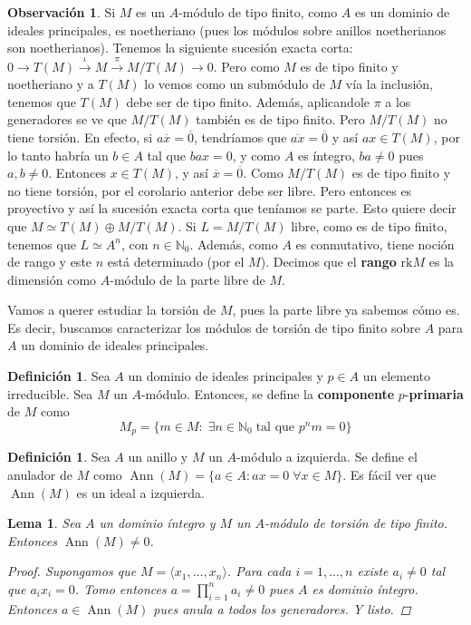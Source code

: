 \documentclass[12pt]{book}
\newtheorem{lem}[teo]{Lema}
\theoremstyle{definition}
\newtheorem{obs}[teo]{Observación}
\newtheorem{defn}[teo]{Definición}
\DeclareMathOperator{\ann}{Ann}
\begin{document}
\begin{obs}
Si $M$ es un $A$-módulo de tipo finito, como $A$ es un dominio de ideales principales, es noetheriano (pues los módulos sobre anillos noetherianos son noetherianos). Tenemos la siguiente sucesión exacta corta: $0\longrightarrow T(M)\stackrel{\iota}{\longrightarrow} M\stackrel{\pi}{\longrightarrow} M/T(M)\longrightarrow 0$. Pero como $M$ es de tipo finito y noetheriano y a $T(M)$ lo vemos como un submódulo de $M$ vía la inclusión, tenemos que $T(M)$ debe ser de tipo finito. Además, aplicandole $\pi$ a los generadores se ve que $M/T(M)$ también es de tipo finito. Pero $M/T(M)$ no tiene torsión. En efecto, si $a\overline{x}=\overline{0}$, tendríamos que $\overline{ax}=\overline{0}$ y así $ax\in T(M)$, por lo tanto habría un $b\in A$ tal que $bax = 0$, y como $A$ es íntegro, $ba\neq 0$ pues $a,b\neq 0$. Entonces $x\in T(M)$, y así $\overline{x}=\overline{0}$. Como $M/T(M)$ es de tipo finito y no tiene torsión, por el corolario anterior debe ser libre. Pero entonces es proyectivo y así la sucesión exacta corta que teníamos se parte. Esto quiere decir que $M\simeq T(M)\oplus M/T(M)$. Si $L=M/T(M)$ libre, como es de tipo finito, tenemos que $L\simeq A^n$, con $n\in\mathbb{N}_0$. Además, como $A$ es conmutativo, tiene noción de rango y este $n$ está determinado (por el $M$). Decimos que el \textbf{rango} $\mathrm{rk}{M}$ es la dimensión como $A$-módulo de la parte libre de $M$.
\end{obs}

Vamos a querer estudiar la torsión de $M$, pues la parte libre ya sabemos cómo es. Es decir, buscamos caracterizar los módulos de torsión de tipo finito sobre $A$ para $A$ un dominio de ideales principales.

\begin{defn}
Sea $A$ un dominio de ideales principales y $p\in A$ un elemento irreducible. Sea $M$ un $A$-módulo. Entonces, se define la \textbf{componente} $p$-\textbf{primaria} de $M$ como $$M_p=\{m\in M : \;\exists n\in\mathbb{N}_0 \; \text{tal que } p^n m = 0 \}$$
\end{defn}
\begin{defn}
Sea $A$ un anillo y $M$ un $A$-módulo a izquierda. Se define el anulador de $M$ como $\ann(M)=\{a\in A : ax=0 \;\forall x\in M\}$. Es fácil ver que $\ann(M)$ es un ideal a izquierda.
\end{defn}

\begin{lem}
Sea $A$ un dominio íntegro y $M$ un $A$-módulo de torsión de tipo finito. Entonces $\ann(M)\neq 0$.
\begin{proof}
Supongamos que $M=\langle x_1,\ldots , x_n\rangle$. Para cada $i=1,\ldots ,n$ existe $a_i\neq 0$ tal que $a_i x_i=0$. Tomo entonces $a=\displaystyle\prod_{i=1}^n a_i\neq 0$ pues $A$ es dominio íntegro. Entonces $a\in\ann(M)$ pues anula a todos los generadores. Y listo.
\end{proof}
\end{lem}
\end{document}
